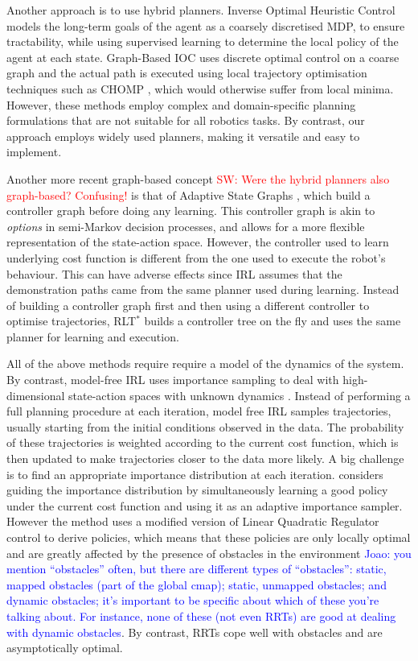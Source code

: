 \documentclass{article}  %
\newcommand{\jm}[1]{\textcolor{blue}{Joao: #1}}
\newcommand{\sw}[1]{\textcolor{red}{SW: #1}}
\begin{document}
Another approach is to use hybrid planners. Inverse Optimal Heuristic Control \cite{ratliff2009inverse} models the long-term goals of the agent as a coarsely discretised MDP, to ensure tractability, while using supervised learning to determine the local policy of the agent at each state. Graph-Based IOC \cite{byravan2015graph} uses discrete optimal control on a coarse graph and the actual path is executed using local trajectory optimisation techniques such as CHOMP \cite{ratliff2009chomp}, which would otherwise suffer from local minima. However, these methods employ complex and domain-specific planning formulations that are not suitable for all robotics tasks. By contrast, our approach employs widely used planners, making it versatile and easy to implement. 

Another more recent graph-based concept \sw{Were the hybrid planners also graph-based? Confusing!} is that of Adaptive State Graphs \cite{okallearning}, which build a controller graph before doing any learning. This controller graph is akin to \emph{options} in semi-Markov decision processes, and allows for a more flexible representation of the state-action space. However, the controller used to learn underlying cost function is different from the one used to execute the robot's behaviour. This can have adverse effects since IRL  assumes that the demonstration paths came from the same planner used during learning.  Instead of building a controller graph first and then using a different controller to optimise trajectories, RLT$^*$ builds a controller tree on the fly and uses the same planner for learning and execution.

 All of the above methods require require a model of the dynamics of the system. By contrast, model-free IRL uses importance sampling to deal with high-dimensional state-action spaces with unknown dynamics \cite{boularias2011relative,kalakrishnan2013learning}. Instead of performing a full planning procedure at each iteration, model free IRL samples trajectories, usually starting from the initial conditions observed in the data. The probability of these trajectories is weighted according to the current cost function, which is then updated to make trajectories closer to the data more likely. A big challenge is to find an appropriate importance distribution at each iteration. \cite{finn2016guided} considers guiding the importance distribution by simultaneously learning a good policy under the current cost function and using it as an adaptive importance sampler. However the method uses a modified version of Linear Quadratic Regulator control to derive policies, which means that these policies are only locally optimal and are greatly affected by the presence of obstacles in the environment \jm{you mention ``obstacles'' often, but there are different types of ``obstacles'': static, mapped obstacles (part of the global cmap); static, unmapped obstacles; and dynamic obstacles; it's important to be specific about which of these you're talking about. For instance, none of these (not even RRTs) are good at dealing with dynamic obstacles}. By contrast, RRTs cope well with obstacles and are asymptotically optimal.
\end{document}
